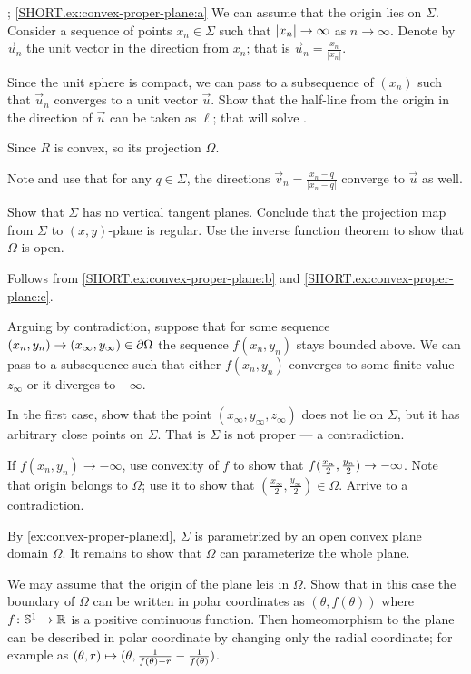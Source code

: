 \parbf{\ref{ex:convex-proper-plane}}; \ref{SHORT.ex:convex-proper-plane:a}
We can assume that the origin lies on $\Sigma$.
Consider a sequence of points $x_n\in \Sigma$ such that $|x_n|\z\to \infty$ as $n\to \infty$.
Denote by $\vec u_n$ the unit vector in the direction from $x_n$; that is $\vec u_n=\tfrac{x_n}{|x_n|}$.

Since the unit sphere is compact, we can pass to a subsequence of $(x_n)$ such that $\vec u_n$ converges to a unit vector $\vec u$.
Show that the half-line from the origin in the direction of $\vec u$ can be taken as $\ell$; that will solve .


Since $R$ is convex, so its projection $\Omega$.

Note and use that for any $q\in \Sigma$, the directions $\vec v_n=\tfrac{x_n-q}{|x_n-q|}$ converge to $\vec u$ as well.

Show that $\Sigma$ has no vertical tangent planes.
Conclude that the projection map from $\Sigma$ to $(x,y)$-plane is regular.
Use the inverse function theorem to show that $\Omega$ is open.

 Follows from \ref{SHORT.ex:convex-proper-plane:b} and \ref{SHORT.ex:convex-proper-plane:c}.

Arguing by contradiction, suppose that for some sequence $(x_n,y_n)\z\to(x_\infty,y_\infty)\in \partial\Omega$ the sequence $f(x_n,y_n)$ stays bounded above.
We can pass to a subsequence such that either $f(x_n,y_n)$ converges to some finite value $z_\infty$ or it diverges to $-\infty$.

In the first case, show that the point $(x_\infty, y_\infty,z_\infty)$ does not lie on $\Sigma$, but it has arbitrary close points on $\Sigma$.
That is $\Sigma$ is not proper --- a contradiction.

If $f(x_n,y_n)\to -\infty$, use convexity of $f$ to show that $f(\tfrac{x_n}2 ,\tfrac{y_n}2)\z\to -\infty$.
Note that origin belongs to $\Omega$;
use it to show that $(\tfrac{x_\infty}2, \tfrac{y_\infty}2)\in\Omega$.
Arrive to a contradiction.

By \ref{ex:convex-proper-plane:d}, $\Sigma$ is parametrized by an open convex plane domain $\Omega$.
It remains to show that $\Omega$ can parameterize the whole plane.

We may assume that the origin of the plane leis in $\Omega$.
Show that in this case the boundary of $\Omega$ can be written in polar coordinates as $(\theta,f(\theta))$ where $f\colon\mathbb{S}^1\to\mathbb{R}$ is a positive continuous function.
Then homeomorphism to the plane can be described in polar coordinate by changing only the radial coordinate;
for example as 
$(\theta,r)\z\mapsto (\theta,
\tfrac1{f(\theta)-r}\z-\tfrac1{f(\theta)})$.

